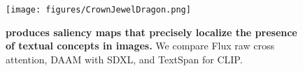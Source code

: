 




\begin{figure}[t!]
    \centering
    \texttt{[image: figures/CrownJewelDragon.png]}
    \vspace{-0.25in}
    \caption{\textbf{\tool{} produces saliency maps that precisely localize the presence of textual concepts in images.}  We compare Flux raw cross attention, DAAM \cite{tang_what_2022} with SDXL, and TextSpan \cite{gandelsman_interpreting_2024} for CLIP. }
    \label{fig:teaser}
\end{figure}

